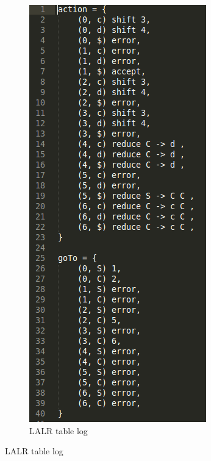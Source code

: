 \documentclass{beamer}
\begin{document}
\begin{frame}
\begin{figure}
\begin{subfigure}[b]{0.3\textwidth}
        \includegraphics[height=0.8\textheight]{LogLALRTable.png}
        \caption{LALR table log}
        \label{fig:lalrtable}
    \end{subfigure}
\end{figure}
\end{frame}
\end{document}
